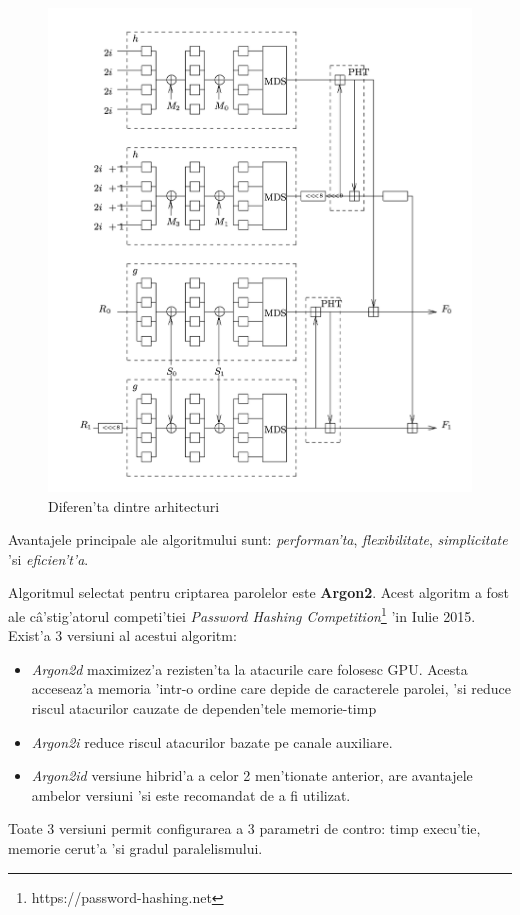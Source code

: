 \documentclass[12pt,a4paper,twoside]{report}
\begin{document}
\begin{figure}[H]
\begin{center}
\advance\leftskip-3cm
\advance\rightskip-3cm
\includegraphics[keepaspectratio=true,scale=0.35]{img/twofish_round.png}
\caption{Diferen'ta dintre arhitecturi}
\label{twofish_round}
\end{center}
\end{figure} 
Avantajele principale ale algoritmului sunt: \textit{performan'ta}, \textit{flexibilitate}, \textit{simplicitate} 'si \textit{eficien't'a}.

Algoritmul selectat pentru criptarea parolelor este \textbf{Argon2}. Acest algoritm a fost ale câ'stig'atorul competi'tiei \textit{Password Hashing Competition}\footnote{https://password-hashing.net} 'in Iulie 2015. Exist'a 3 versiuni al acestui algoritm:
\begin{itemize}
\item{\textit{Argon2d} maximizez'a rezisten'ta la atacurile care folosesc GPU. Acesta acceseaz'a memoria 'intr-o ordine care depide de caracterele parolei, 'si reduce riscul atacurilor cauzate de dependen'tele memorie-timp}
\item{\textit{Argon2i} reduce riscul atacurilor bazate pe canale auxiliare.}
\item{\textit{Argon2id} versiune hibrid'a a celor 2 men'tionate anterior, are avantajele ambelor versiuni 'si este recomandat de a fi utilizat.}
\end{itemize}
Toate 3 versiuni permit configurarea a 3 parametri de contro: timp execu'tie, memorie cerut'a 'si gradul paralelismului.
\end{document}
